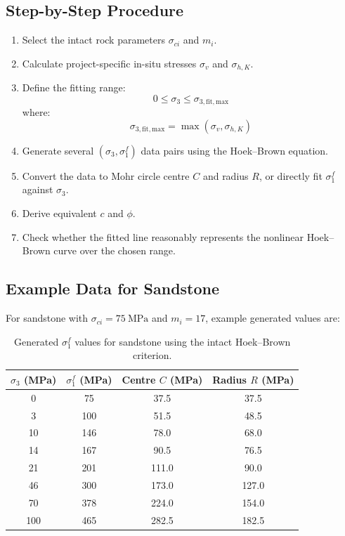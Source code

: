 \documentclass[a4paper,12pt]{article}
\begin{document}
\subsection{Step-by-Step Procedure}

\begin{enumerate}
    \item Select the intact rock parameters \(\sigma_{ci}\) and \(m_i\).
    \item Calculate project-specific in-situ stresses \(\sigma_v\) and \(\sigma_{h,K}\).
    \item Define the fitting range:
    \[
    0 \leq \sigma_3 \leq \sigma_{3,\mathrm{fit,max}}
    \]
    where:
    \[
    \sigma_{3,\mathrm{fit,max}}=\max(\sigma_v,\sigma_{h,K})
    \]
    \item Generate several \((\sigma_3,\sigma_1^f)\) data pairs using the Hoek--Brown equation.
    \item Convert the data to Mohr circle centre \(C\) and radius \(R\), or directly fit
    \(\sigma_1^f\) against \(\sigma_3\).
    \item Derive equivalent \(c\) and \(\phi\).
    \item Check whether the fitted line reasonably represents the nonlinear Hoek--Brown curve
    over the chosen range.
\end{enumerate}

\subsection{Example Data for Sandstone}

For sandstone with \(\sigma_{ci}=75~\text{MPa}\) and \(m_i=17\), example generated values are:

\begin{table}[H]
\centering
\small
\begin{tabular}{c c c c}
\toprule
\(\sigma_3\) (MPa) & \(\sigma_1^f\) (MPa) & Centre \(C\) (MPa) & Radius \(R\) (MPa) \\
\midrule
0   & 75  & 37.5  & 37.5 \\
3   & 100 & 51.5  & 48.5 \\
10  & 146 & 78.0  & 68.0 \\
14  & 167 & 90.5  & 76.5 \\
21  & 201 & 111.0 & 90.0 \\
46  & 300 & 173.0 & 127.0 \\
70  & 378 & 224.0 & 154.0 \\
100 & 465 & 282.5 & 182.5 \\
\bottomrule
\end{tabular}
\caption{Generated \(\sigma_1^f\) values for sandstone using the intact Hoek--Brown criterion.}
\end{table}
\end{document}
